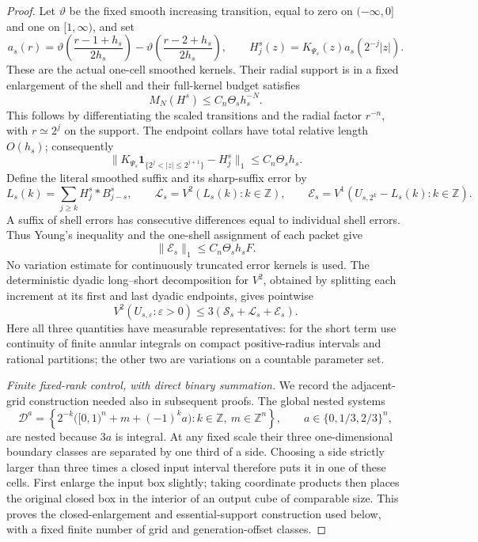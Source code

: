 \documentclass[11pt]{article}
\numberwithin{equation}{section}
\theoremstyle{remark}
\theoremstyle{definition}
\begin{document}
\begin{proof}
Let $\vartheta$ be the fixed smooth increasing transition, equal to zero
on $(-\infty,0]$ and one on $[1,\infty)$, and set
\[
 a_s(r)=\vartheta\!\left(\frac{r-1+h_s}{2h_s}\right)
        -\vartheta\!\left(\frac{r-2+h_s}{2h_s}\right),\qquad
 H_j^s(z)=K_{\Psi_s}(z)a_s(2^{-j}|z|).
\]
These are the actual one-cell smoothed kernels.  Their radial support is
in a fixed enlargement of the shell and their full-kernel budget satisfies
\begin{equation}\label{eq:nonosc-MN}
 M_N(H^s)\le C_n\Theta_sh_s^{-N}.
\end{equation}
This follows by differentiating the scaled transitions and the radial
factor $r^{-n}$, with $r\simeq2^j$ on the support.
The endpoint collars have total relative length $O(h_s)$; consequently
\[
 \|K_{\Psi_s}\mathbf1_{\{2^j<|z|\le2^{j+1}\}}-H_j^s\|_1
 \le C_n\Theta_sh_s.
\]
Define the literal smoothed suffix and its sharp-suffix error by
\[
 L_s(k)=\sum_{j\ge k}H_j^s*B_{j-s}^s,\qquad
 \mathcal L_s=V^2(L_s(k):k\in\mathbb Z),\qquad
 \mathcal E_s=V^1(U_{s,2^k}-L_s(k):k\in\mathbb Z).
\]
A suffix of shell errors has consecutive differences equal to individual
shell errors.  Thus Young's inequality and the one-shell assignment of
each packet give
\begin{equation}\label{eq:nonosc-suffix-error}
 \|\mathcal E_s\|_1\le C_n\Theta_sh_sF.
\end{equation}
No variation estimate for continuously truncated error kernels is used.
The deterministic dyadic long--short decomposition for $V^2$, obtained by
splitting each increment at its first and last dyadic endpoints, gives
pointwise
\begin{equation}\label{eq:nonosc-onegap-v2}
 V^2(U_{s,\varepsilon}:\varepsilon>0)
 \le3(\mathcal S_s+\mathcal L_s+\mathcal E_s).
\end{equation}
Here all three quantities have measurable representatives: for the short
term use continuity of finite annular integrals on compact positive-radius
intervals and rational partitions; the other two are variations on a countable parameter set.

\smallskip
\noindent\emph{Finite fixed-rank control, with direct binary summation.}
We record the adjacent-grid construction needed also in subsequent proofs.
The global nested systems
\begin{equation}\label{eq:adjacent-grids}
 \mathcal D^a=\left\{2^{-k}\bigl([0,1)^n+m+(-1)^ka\bigr):
 k\in\mathbb Z,\ m\in\mathbb Z^n\right\},
 \qquad a\in\{0,1/3,2/3\}^n,
\end{equation}
are nested because $3a$ is integral.  At any fixed scale their three
one-dimensional boundary classes are separated by one third of a side.
Choosing a side strictly larger than three times a closed input interval
therefore puts it in one of these cells.  First enlarge the input box
slightly; taking coordinate products then places the original closed box
in the interior of an output cube of comparable size.  This proves the
closed-enlargement and essential-support construction used below, with a
fixed finite number of grid and generation-offset classes.


\end{proof}
\end{document}
